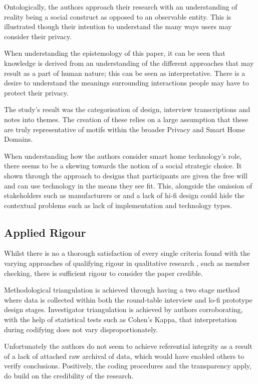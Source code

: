 Ontologically, the authors approach their research with an understanding of reality being a social construct as opposed to an observable entity. This is illustrated though their intention to understand the many ways users may consider their privacy.

When understanding the epistemology of this paper, it can be seen that knowledge is derived from an understanding of the different approaches that may result as a part of human nature; this can be seen as interpretative. There is a desire to understand the meanings surrounding interactions people may have to protect their privacy. 

The study's result was the categorisation of design, interview transcriptions and notes into themes. The creation of these relies on a large assumption that these are truly representative of motifs within the broader Privacy and Smart Home Domains. 

When understanding how the authors consider smart home technology's role, there seems to be a skewing towards the notion of a social strategic choice. It shown through the approach to designs that participants are given the free will and can use technology in the means they see fit. This, alongside the omission of stakeholders such as manufacturers or and a lack of hi-fi design could hide the contextual problems such as lack of implementation and technology types. 

\subsection{Applied Rigour}

Whilst there is no a thorough satisfaction of every single criteria found with the varying approaches of qualifying rigour in qualitative research \parencite{lincolnGuba1985}, such as member checking, there is sufficient rigour to consider the paper credible.

Methodological triangulation is achieved through having a two stage method where data is collected within both the round-table interview and lo-fi prototype design stages. Investigator triangulation is achieved by authors corroborating, with the help of statistical tests such as Cohen's Kappa, that interpretation during codifying does not vary disproportionately. 

Unfortunately the authors do not seem to achieve referential integrity as a result of a lack of attached raw archival of data, which would have enabled others to verify conclusions. Positively, the coding procedures and the transparency apply, do build on the credibility of the research.

